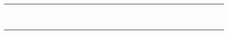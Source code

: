 \documentclass[10pt]{article}
\begin{document}
\begin{center}
\begin{tabular}{|c|c|c|c|c|c|c|c|c|c|c|c|c|c|c|c|c|c|c|c|c|c|c|c|c|c|c|c|c|c|c|c|}
\hline
 &  &  &  &  &  &  &  &  &  &  &  &  &  &  &  &  &  &  &  &  &  &  &  &  &  &  &  &  &  &  &  \\
\hline
 &  &  &  &  &  &  &  &  &  &  &  &  &  &  &  &  &  &  &  &  &  &  &  &  &  &  &  &  &  &  &  \\
\hline
 &  &  &  &  &  &  &  &  &  &  &  &  &  &  &  &  &  &  &  &  &  &  &  &  &  &  &  &  &  &  &  \\
\hline
 &  &  &  &  &  &  &  &  &  &  &  &  &  &  &  &  &  &  &  &  &  &  &  &  &  &  &  &  &  &  &  \\
\hline
 &  &  &  &  &  &  &  &  &  &  &  &  &  &  &  &  &  &  &  &  &  &  &  &  &  &  &  &  &  &  &  \\
\hline
 &  &  &  &  &  &  &  &  &  &  &  &  &  &  &  &  &  &  &  &  &  &  &  &  &  &  &  &  &  &  &  \\
\hline
 &  &  &  &  &  &  &  &  &  &  &  &  &  &  &  &  &  &  &  &  &  &  &  &  &  &  &  &  &  &  &  \\
\hline
 &  &  &  &  &  &  &  &  &  &  &  &  &  &  &  &  &  &  &  &  &  &  &  &  &  &  &  &  &  &  &  \\
\hline
 &  &  &  &  &  &  &  &  &  &  &  &  &  &  &  &  &  &  &  &  &  &  &  &  &  &  &  &  &  &  &  \\
\hline
 &  &  &  &  &  &  &  &  &  &  &  &  &  &  &  &  &  &  &  &  &  &  &  &  &  &  &  &  &  &  &  \\
\hline
 &  &  &  &  &  &  &  &  &  &  &  &  &  &  &  &  &  &  &  &  &  &  &  &  &  &  &  &  &  &  &  \\
\hline
\end{tabular}
\end{center}
\end{document}
